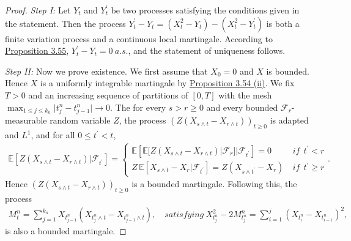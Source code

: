 \documentclass{article}
\numberwithin{equation}{section}
\newcommand{\E}{\mathbb{E}}
\theoremstyle{plain}
\theoremstyle{definition}
\begin{document}
\begin{proof}
\textit{Step I:} Let $Y_t$ and $Y^\prime_t$ be two processes satisfying the conditions given in the statement. Then the process $Y_t^\prime-Y_t=(X_t^2-Y_t)-(X_t^2-Y_t^\prime)$ is both a finite variation process and a continuous local martingale. According to \hyperref[prop:3.55]{Proposition 3.55}, $Y_t^\prime - Y_t = 0\ a.s.$, and the statement of uniqueness follows. \vspace{0.1cm}

\textit{Step II:} Now we prove existence. We first assume that $X_0=0$ and $X$ is bounded. Hence $X$ is a uniformly  integrable martingale by \hyperref[prop:3.54]{Proposition 3.54 (ii)}. We fix $T>0$ and an increasing sequence of partitions of $[0,T]$ with the mesh $\max_{1\leq j\leq k_n}\vert t_j^n-t_{j-1}^n\vert\to 0$. The for every $s>r\geq 0$ and every bounded $\mathscr{F}_r$-measurable random variable $Z$, the process $
\left(Z\left(X_{s\wedge t}-X_{r\wedge t}\right)\right)_{t\geq 0}$ is adapted and $L^1$, and for all $0\leq t^\prime < t$,
\begin{align*}
	\E\left[Z\left(X_{s\wedge t}-X_{r\wedge t}\right)|\mathscr{F}_{t^\prime}\right] = \begin{cases}
		\E\left[\E[Z\left(X_{s\wedge t}-X_{r\wedge t}\right)|\mathscr{F}_r]|\mathscr{F}_{t^\prime}\right] = 0\ &\textit{if}\ \ t^\prime < r\\
		Z\,\E\left[X_{s\wedge t} - X_r|\mathscr{F}_{t^\prime}\right] = Z(X_{s\wedge t^\prime}-X_r)\ &\textit{if}\ \ t^\prime\geq r
	\end{cases}.
\end{align*}
Hence $\left(Z\left(X_{s\wedge t}-X_{r\wedge t}\right)\right)_{t\geq 0}$ is a bounded martingale. Following this, the process
\begin{align*}
	M_t^n = \sum_{j=1}^{k_n} X_{t_{j-1}^n}\left(X_{t_j^n\wedge t}-X_{t_{j-1}^n\wedge t}\right),\quad \textit{satisfying}\ X_{t_j^n}^2-2M_{t_j^n}^n = \sum_{i=1}^{j}\left(X_{t_i^n}-X_{t_{i-1}^n}\right)^2,
\end{align*}
is also a bounded martingale. 


\end{proof}
\end{document}
